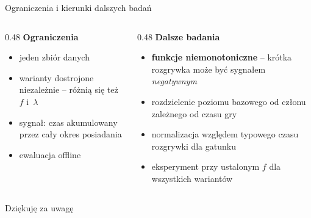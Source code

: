\documentclass[aspectratio=169,11pt]{beamer}
\begin{document}
\begin{frame}{Ograniczenia i kierunki dalszych badań}

  \begin{columns}[t]
    \begin{column}{0.48\textwidth}
      \textbf{Ograniczenia}
      \small
      \begin{itemize}
        \item jeden zbiór danych
        \item warianty dostrojone niezależnie -- różnią się też $f$ i~$\lambda$
        \item sygnał: czas akumulowany przez cały okres posiadania
        \item ewaluacja offline
      \end{itemize}
    \end{column}
    \begin{column}{0.48\textwidth}
      \textbf{Dalsze badania}
      \small
      \begin{itemize}
        \item \textbf{funkcje niemonotoniczne} -- krótka rozgrywka może być sygnałem
              \emph{negatywnym}
        \item rozdzielenie poziomu bazowego od członu zależnego od czasu gry
        \item normalizacja względem typowego czasu rozgrywki dla gatunku
        \item eksperyment przy ustalonym $f$ dla wszystkich wariantów
      \end{itemize}
    \end{column}
  \end{columns}

\end{frame}


\begin{frame}[plain]
  \begin{center}
    \Large Dziękuję za uwagę
  \end{center}
\end{frame}


\appendix
\end{document}
